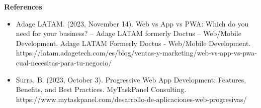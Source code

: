 \documentclass[]{report}
\begin{document}
\vspace{4em}
\newpage

\begin{flushleft}
    \textbf{\LARGE References}
\end{flushleft}
\begin{flushleft}
    \begin{itemize}
        \item Adage LATAM. (2023, November 14). Web vs App vs PWA: Which do you need for your business? – Adage LATAM formerly Doctus – Web/Mobile Development. Adage LATAM Formerly Doctus - Web/Mobile Development. https://latam.adagetech.com/es/blog/ventas-y-marketing/web-vs-app-vs-pwa-cual-necesitas-para-tu-negocio/
        \item Surra, B. (2023, October 3). Progressive Web App Development: Features, Benefits, and Best Practices. MyTaskPanel Consulting. https://www.mytaskpanel.com/desarrollo-de-aplicaciones-web-progresivas/
    \end{itemize}
\end{flushleft}
\end{document}
